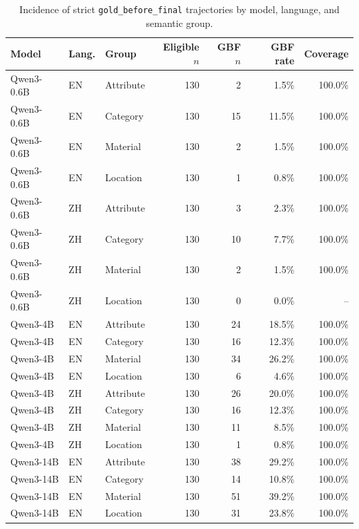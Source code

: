 \begin{table}[t]
    \centering
    \caption{Incidence of strict \texttt{gold\_before\_final} trajectories by model, language, and semantic group.}
    \label{tab:gold_before_final_incidence}
    \begin{tabular}{lllrrrr}
        \toprule
        Model & Lang. & Group & Eligible $n$ & GBF $n$ & GBF rate & Coverage \\
        \midrule
        Qwen3-0.6B & EN & Attribute & 130 & 2 & 1.5\% & 100.0\% \\
        Qwen3-0.6B & EN & Category & 130 & 15 & 11.5\% & 100.0\% \\
        Qwen3-0.6B & EN & Material & 130 & 2 & 1.5\% & 100.0\% \\
        Qwen3-0.6B & EN & Location & 130 & 1 & 0.8\% & 100.0\% \\
        Qwen3-0.6B & ZH & Attribute & 130 & 3 & 2.3\% & 100.0\% \\
        Qwen3-0.6B & ZH & Category & 130 & 10 & 7.7\% & 100.0\% \\
        Qwen3-0.6B & ZH & Material & 130 & 2 & 1.5\% & 100.0\% \\
        Qwen3-0.6B & ZH & Location & 130 & 0 & 0.0\% & -- \\
        \addlinespace
        Qwen3-4B & EN & Attribute & 130 & 24 & 18.5\% & 100.0\% \\
        Qwen3-4B & EN & Category & 130 & 16 & 12.3\% & 100.0\% \\
        Qwen3-4B & EN & Material & 130 & 34 & 26.2\% & 100.0\% \\
        Qwen3-4B & EN & Location & 130 & 6 & 4.6\% & 100.0\% \\
        Qwen3-4B & ZH & Attribute & 130 & 26 & 20.0\% & 100.0\% \\
        Qwen3-4B & ZH & Category & 130 & 16 & 12.3\% & 100.0\% \\
        Qwen3-4B & ZH & Material & 130 & 11 & 8.5\% & 100.0\% \\
        Qwen3-4B & ZH & Location & 130 & 1 & 0.8\% & 100.0\% \\
        \addlinespace
        Qwen3-14B & EN & Attribute & 130 & 38 & 29.2\% & 100.0\% \\
        Qwen3-14B & EN & Category & 130 & 14 & 10.8\% & 100.0\% \\
        Qwen3-14B & EN & Material & 130 & 51 & 39.2\% & 100.0\% \\
        Qwen3-14B & EN & Location & 130 & 31 & 23.8\% & 100.0\% \\

\end{tabular}
\end{table}
